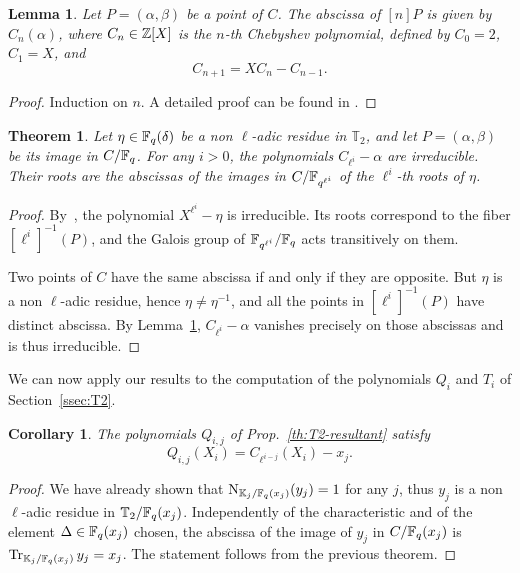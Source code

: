 \documentclass{sig-alternate}
\newtheorem{theorem}[definition]{Theorem}
\newtheorem{lemma}[definition]{Lemma}
\newtheorem{corollary}[definition]{Corollary}
\begin{document}
\begin{lemma}
  \label{th:T2-divpol}
  Let $P=(\alpha,\beta)$ be a point of $C$. The abscissa of $[n]P$ is
  given by $C_n(\alpha)$, where $C_n\in\mathbb{Z}[X]$ is the $n$-th Chebyshev
  polynomial, defined by $C_0=2$, $C_1=X$, and
  \begin{equation}
    \label{eq:Chebyshev}
    C_{n+1} = XC_n - C_{n-1}.
  \end{equation}
\end{lemma}
\begin{proof}
  Induction on $n$. A detailed proof can be found in
  \cite[Prop.~6.6]{silverman2007arithmetic}.
\end{proof}





\begin{theorem}
  \label{th:T2-irred}
  Let $\eta\in\mathbb{F}_q(\delta)$ be a non $\ell$-adic residue in $\mathbb{T}_2$, and
  let $P=(\alpha,\beta)$ be its image in $C/\mathbb{F}_q$. For any $i>0$, the
  polynomials $C_{\ell^i}-\alpha$ are irreducible. Their roots are the
  abscissas of the images in $C/\mathbb{F}_{q^{\ell^i}}$ of the $\ell^i$-th
  roots of $\eta$.
\end{theorem}
\begin{proof}
  By~\cite[Th.~VI.9.1]{lang}, the polynomial $X^{\ell^i}-\eta$ is
  irreducible. Its roots correspond to the fiber $[\ell^i]^{-1}(P)$,
  and the Galois group of $\mathbb{F}_{q^{\ell^i}}/\mathbb{F}_q$ acts transitively on
  them.

  Two points of $C$ have the same abscissa if and only if they are
  opposite. But $\eta$ is a non $\ell$-adic residue, hence
  $\eta\ne\eta^{-1}$, and all the points in $[\ell^i]^{-1}(P)$ have
  distinct abscissa.  By Lemma~\ref{th:T2-divpol}, $C_{\ell^i}-\alpha$
  vanishes precisely on those abscissas and is thus irreducible.
\end{proof}

We can now apply our results to the computation of the polynomials
$Q_i$ and $T_i$ of Section~\ref{ssec:T2}.

\begin{corollary}
  The polynomials $Q_{i,j}$ of Prop.~\ref{th:T2-resultant}
  satisfy
  \begin{equation*}
    Q_{i,j}(X_i) = C_{\ell^{i-j}}(X_i) - x_j.
  \end{equation*}
\end{corollary}
\begin{proof}
  We have already shown that $\operatorname{N}_{\mathbb{K}_j/\mathbb{F}_q(x_j)}(y_j)=1$ for any
  $j$, thus $y_j$ is a non $\ell$-adic residue in
  $\mathbb{T}_2/\mathbb{F}_q(x_j)$. Independently of the characteristic and of the
  element $\Delta\in\mathbb{F}_q(x_j)$ chosen, the abscissa of the image of
  $y_j$ in $C/\mathbb{F}_q(x_j)$ is $\operatorname{Tr}_{\mathbb{K}_j/\mathbb{F}_q(x_j)}y_j=x_j$. The
  statement follows from the previous theorem.
\end{proof}
\end{document}

